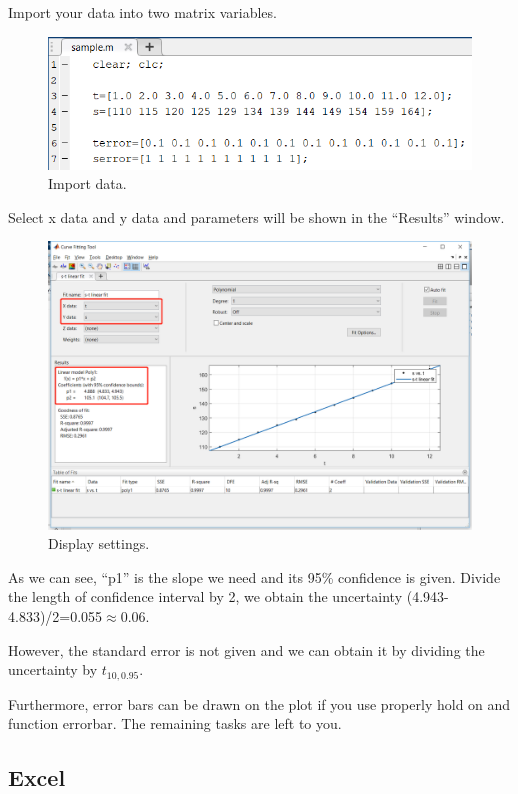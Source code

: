 \documentclass[12pt]{article}
\begin{document}
Import your data into two matrix variables.

\begin{figure}[H]
\centering
\includegraphics[width=12cm]{m1.png}
\caption{Import data.}
\end{figure}

\newpage
Select \textsf{x data} and \textsf{y data} and parameters will be shown in the ``Results'' window.

\begin{figure}[H]
\centering
\includegraphics[width=15cm]{m2.png}
\caption{Display settings.}
\end{figure}

As we can see, ``p1'' is the slope we need and its 95\% confidence is given. Divide the length of confidence interval by 2, we obtain the uncertainty (4.943-4.833)/2=0.055$\approx$0.06.

However, the standard error is not given and we can obtain it by dividing the uncertainty by $t_{10,0.95}$.

Furthermore, error bars can be drawn on the plot if you use properly \textsf{hold on} and function \textsf{errorbar}. The remaining tasks are left to you.


\newpage
\subsection{Excel}
\end{document}
